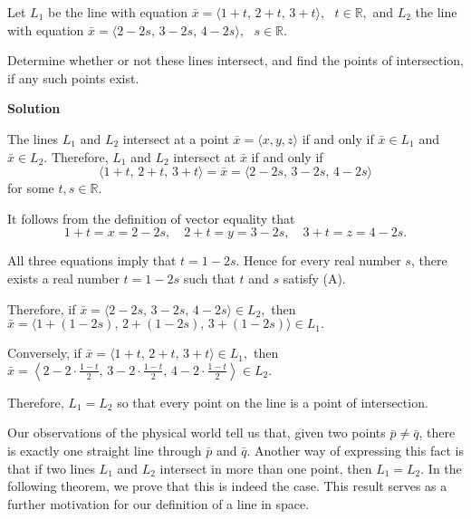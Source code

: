 \begin{examplebox}
  Let $L_1$ be the line with equation $\bar{x} = \langle 1 + t,\, 2 + t,\, 3 + t \rangle,\text{ } t \in \mathbb{R},$
and $L_2$ the line with equation $\bar{x} = \langle 2 - 2s,\, 3 - 2s,\, 4 - 2s \rangle, \text{ } s \in \mathbb{R}.$

Determine whether or not these lines intersect, and find the points of intersection, if any such points exist.

\vspace{0.5em}

\textbf{Solution}

\vspace{0.5em}

The lines $L_1$ and $L_2$ intersect at a point $\bar{x} = \langle x, y, z \rangle$ if and only if $\bar{x} \in L_1$ and $\bar{x} \in L_2$. Therefore, $L_1$ and $L_2$ intersect at $\bar{x}$ if and only if
\[
\langle 1 + t,\, 2 + t,\, 3 + t \rangle = \bar{x} = \langle 2 - 2s,\, 3 - 2s,\, 4 - 2s \rangle
\]
for some $t, s \in \mathbb{R}$.

It follows from the definition of vector equality that
\[
1 + t = x = 2 - 2s, \quad 2 + t = y = 3 - 2s, \quad 3 + t = z = 4 - 2s.
\tag{A}
\]

All three equations imply that $t = 1 - 2s.$ Hence for every real number $s$, there exists a real number $t = 1 - 2s$ such that $t$ and $s$ satisfy (A). 

Therefore, if 
$\bar{x} = \langle 2 - 2s,\, 3 - 2s,\, 4 - 2s \rangle \in L_2,$
then
$\bar{x} = \langle 1 + (1 - 2s),\, 2 + (1 - 2s),\, 3 + (1 - 2s) \rangle \in L_1.$

Conversely, if
$\bar{x} = \langle 1 + t,\, 2 + t,\, 3 + t \rangle \in L_1,$
then
$\bar{x} = \left\langle 2 - 2 \cdot \frac{1 - t}{2},\, 3 - 2 \cdot \frac{1 - t}{2},\, 4 - 2 \cdot \frac{1 - t}{2} \right\rangle \in L_2.$


Therefore, $L_1 = L_2$ so that every point on the line is a point of intersection.

\end{examplebox}

Our observations of the physical world tell us that, given two points $\bar{p} \neq \bar{q}$, there is exactly one straight line through $\bar{p}$ and $\bar{q}$. Another way of expressing this fact is that if two lines $L_1$ and $L_2$ intersect in more than one point, then $L_1 = L_2$. In the following theorem, we prove that this is indeed the case. This result serves as a further motivation for our definition of a line in space.

